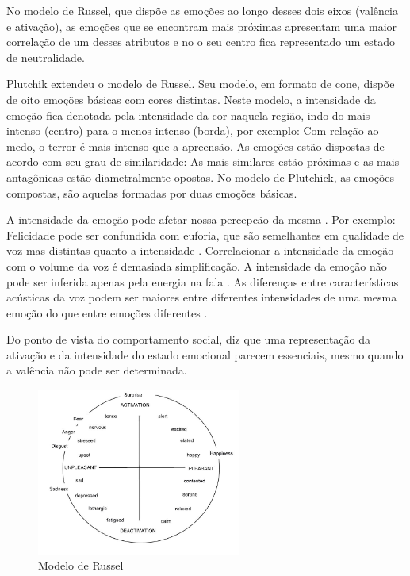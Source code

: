 No modelo de Russel, que dispõe as emoções ao longo desses dois eixos (valência e ativação), as
emoções que se encontram mais próximas apresentam uma maior correlação de um desses atributos e no o seu centro fica representado um estado de neutralidade.

Plutchik extendeu \cite{57} o modelo de Russel. Seu modelo, em formato de cone, dispõe de oito emoções básicas com cores distintas. Neste modelo, a intensidade da emoção fica denotada pela intensidade da cor naquela região, indo do mais intenso (centro) para o menos intenso (borda), por exemplo: Com relação ao medo, o terror é mais intenso que a apreensão. As emoções estão dispostas de acordo com seu grau de similaridade: As mais similares estão próximas e as mais antagônicas estão diametralmente opostas. No modelo de Plutchick, as emoções compostas, são aquelas formadas por duas emoções básicas.

A intensidade da emoção pode afetar nossa percepcão da mesma \cite{18.46}. Por exemplo: Felicidade pode ser confundida com euforia, que são semelhantes em qualidade de voz mas distintas quanto a intensidade \cite{18.9}. Correlacionar a intensidade da emoção com o volume da voz é demasiada simplificação. A intensidade da emoção não pode ser inferida apenas pela energia na fala \cite{18.12}. As diferenças entre características acústicas da voz podem ser maiores entre diferentes intensidades de uma mesma emoção do que entre emoções diferentes \cite{18.46}.

Do ponto de vista do comportamento social, \cite{16} diz que uma representação da ativação e da intensidade do estado emocional parecem essenciais, mesmo quando a valência não pode ser determinada.

\begin{figure}[!ht]
\centering
\includegraphics[width=0.6\textwidth]{imagens/russel.JPG}
\caption{\label{fig:russel}Modelo de Russel \cite{25}}
\end{figure}

